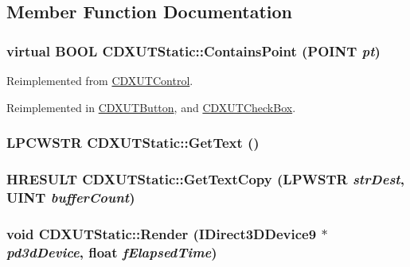 \subsection{Member Function Documentation}
\hypertarget{class_c_d_x_u_t_static_ae32024764670a1f5b1ad0ba4a8570d63}{
\subsubsection[{ContainsPoint}]{\setlength{\rightskip}{0pt plus 5cm}virtual BOOL CDXUTStatic::ContainsPoint (POINT {\em pt})}}
\label{class_c_d_x_u_t_static_ae32024764670a1f5b1ad0ba4a8570d63}


Reimplemented from \hyperlink{class_c_d_x_u_t_control_a9b4410bbd1cac9a0ffce760aaa9a2d48}{CDXUTControl}.

Reimplemented in \hyperlink{class_c_d_x_u_t_button_a2209ea24f5ba76d7506b368c80940172}{CDXUTButton}, and \hyperlink{class_c_d_x_u_t_check_box_af0a106a73957da96d23dd53c2b9da8e8}{CDXUTCheckBox}.\hypertarget{class_c_d_x_u_t_static_a3da09900b41866941215aacc9da64803}{
\subsubsection[{GetText}]{\setlength{\rightskip}{0pt plus 5cm}LPCWSTR CDXUTStatic::GetText ()}}
\label{class_c_d_x_u_t_static_a3da09900b41866941215aacc9da64803}
\hypertarget{class_c_d_x_u_t_static_a8e72da05ab9718c59f1c667289950c5d}{
\subsubsection[{GetTextCopy}]{\setlength{\rightskip}{0pt plus 5cm}HRESULT CDXUTStatic::GetTextCopy ({\bf LPWSTR} {\em strDest}, \/  UINT {\em bufferCount})}}
\label{class_c_d_x_u_t_static_a8e72da05ab9718c59f1c667289950c5d}
\hypertarget{class_c_d_x_u_t_static_a7237fbf3accc077c35c2dd79b9bd2e3e}{
\subsubsection[{Render}]{\setlength{\rightskip}{0pt plus 5cm}void CDXUTStatic::Render (IDirect3DDevice9 $\ast$ {\em pd3dDevice}, \/  float {\em fElapsedTime})}}
\label{class_c_d_x_u_t_static_a7237fbf3accc077c35c2dd79b9bd2e3e}


